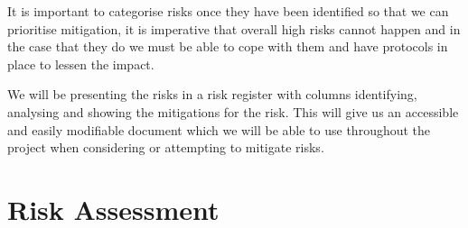It is important to categorise risks once they have been identified so that we can prioritise mitigation, it is imperative that overall high risks cannot happen and in the case that they do we must be able to cope with them and have protocols in place to lessen the impact.

We will be presenting the risks in a risk register with columns identifying, analysing and showing the mitigations for the risk.
This will give us an accessible and easily modifiable document which we will be able to use throughout the project when considering or attempting to mitigate risks.

\newpage
\section{Risk Assessment}